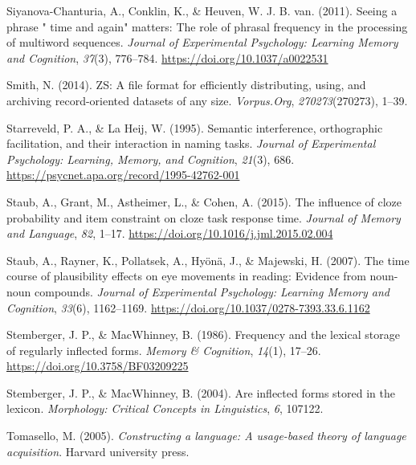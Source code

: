 \documentclass[
  12pt,
  letterpaper,
]{scrreprt}
\newlength{\cslhangindent}
\newenvironment{CSLReferences}[2] %
 {\begin{list}{}{%
  \setlength{\itemindent}{0pt}
  \setlength{\leftmargin}{0pt}
  \setlength{\parsep}{0pt}
  \ifodd #1
   \setlength{\leftmargin}{\cslhangindent}
   \setlength{\itemindent}{-1\cslhangindent}
  \fi
  \setlength{\itemsep}{#2\baselineskip}}}
 {\end{list}}
\begin{document}
\begin{CSLReferences}{1}{0}
Siyanova-Chanturia, A., Conklin, K., \& Heuven, W. J. B. van. (2011).
Seeing a phrase {"} time and again{"} matters: The role of phrasal
frequency in the processing of multiword sequences. \emph{Journal of
Experimental Psychology: Learning Memory and Cognition}, \emph{37}(3),
776--784. \url{https://doi.org/10.1037/a0022531}

Smith, N. (2014). ZS: A file format for efficiently distributing, using,
and archiving record-oriented datasets of any size. \emph{Vorpus.Org},
\emph{270273}(270273), 1--39.

Starreveld, P. A., \& La Heij, W. (1995). Semantic interference,
orthographic facilitation, and their interaction in naming tasks.
\emph{Journal of Experimental Psychology: Learning, Memory, and
Cognition}, \emph{21}(3), 686.
\url{https://psycnet.apa.org/record/1995-42762-001}

Staub, A., Grant, M., Astheimer, L., \& Cohen, A. (2015). The influence
of cloze probability and item constraint on cloze task response time.
\emph{Journal of Memory and Language}, \emph{82}, 1--17.
\url{https://doi.org/10.1016/j.jml.2015.02.004}

Staub, A., Rayner, K., Pollatsek, A., Hyönä, J., \& Majewski, H. (2007).
The time course of plausibility effects on eye movements in reading:
Evidence from noun-noun compounds. \emph{Journal of Experimental
Psychology: Learning Memory and Cognition}, \emph{33}(6), 1162--1169.
\url{https://doi.org/10.1037/0278-7393.33.6.1162}

Stemberger, J. P., \& MacWhinney, B. (1986). Frequency and the lexical
storage of regularly inflected forms. \emph{Memory \& Cognition},
\emph{14}(1), 17--26. \url{https://doi.org/10.3758/BF03209225}

Stemberger, J. P., \& MacWhinney, B. (2004). Are inflected forms stored
in the lexicon. \emph{Morphology: Critical Concepts in Linguistics},
\emph{6}, 107122.

Tomasello, M. (2005). \emph{Constructing a language: A usage-based
theory of language acquisition}. Harvard university press.


\end{CSLReferences}
\end{document}
